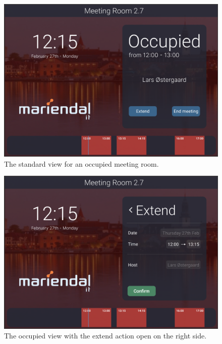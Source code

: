   \begin{figure}[h!]
    \centering
    \includegraphics[width=1\textwidth]{images/occupied_normal.png}
    \caption{The standard view for an occupied meeting room.}
    \label{fig:occupied_normal}
  \end{figure}

  \begin{figure}[h!]
    \centering
    \includegraphics[width=1\textwidth]{images/occupied_extend.png}
    \caption{The occupied view with the extend action open on the right side.}
    \label{fig:occupied_extend}
  \end{figure}

